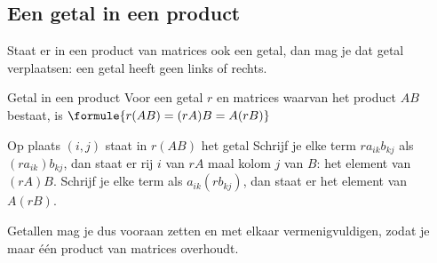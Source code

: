 \subsection{Een getal in een product}

Staat er in een product van matrices ook een getal, dan mag je dat getal verplaatsen: een getal heeft geen links of rechts.

\begin{theorie}
\begin{stelling}{Getal in een product}
Voor een getal $r$ en matrices waarvan het product $AB$ bestaat, is \qquad $\formule{r(AB) = (rA)B = A(rB)}$
\end{stelling}

\begin{bewijs}
Op plaats $(i, j)$ staat in $r(AB)$ het getal
Schrijf je elke term $ra_{ik}b_{kj}$ als $(ra_{ik})b_{kj}$, dan staat er rij $i$ van $rA$ maal kolom $j$ van $B$: het element van $(rA)B$. Schrijf je elke term als $a_{ik}(rb_{kj})$, dan staat er het element van $A(rB)$.
\end{bewijs}
\end{theorie}

Getallen mag je dus vooraan zetten en met elkaar vermenigvuldigen, zodat je maar één product van matrices overhoudt.


